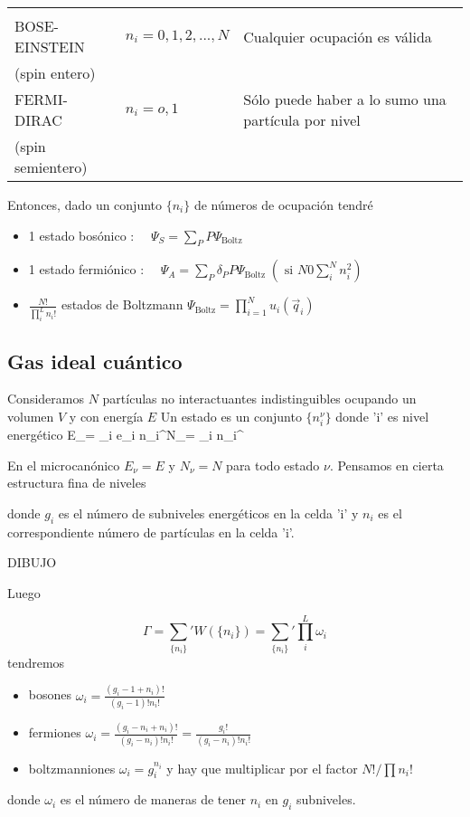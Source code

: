 \documentclass[10pt,oneside]{CBFT_book}
\begin{document}
\begin{center}
\begin{tabular}{|l|l|l|}
\hline
 & & \\
BOSE-EINSTEIN & $ n_i = 0,1,2, ... , N $ & Cualquier ocupación es válida \\
 (spin entero) & & \\
FERMI-DIRAC  & $ n_i = o, 1 $ & Sólo puede haber a lo sumo una partícula por nivel \\
 (spin semientero) & & \\
\hline
\end{tabular}
\end{center}

Entonces, dado un conjunto $ \{ n_i \} $ de números de ocupación tendré 

\begin{itemize}
\item 1 estado bosónico : $ \quad \Psi_S = \sum_P P \Psi_{\text{Boltz}}$
\item 1 estado fermiónico : $ \quad \Psi_A = \sum_P \delta_P P \Psi_{\text{Boltz}} 
	\; (\text{ si } N 0 \sum_i^N n_i^2 )$
\item $ \frac{N!}{\prod_i^L n_i!} $ estados de Boltzmann $ \Psi_{\text{Boltz}} = \prod_{i=1}^N u_i(\vec{q}_i) $
\end{itemize}


\subsection{Gas ideal cuántico}

Consideramos $N$ partículas no interactuantes indistinguibles ocupando un volumen $V$ y con energía $E$
Un estado es un conjunto $ \{ n_i^\nu \} $ donde 'i' es nivel energético
\be
	E_\nu = \sum_i e_i n_i^\nu \qquad \qquad N_\nu = \sum_i n_i^\nu
	\label{cond_EN}
\ee

En el microcanónico $ E_\nu = E $ y $ N_\nu = N $ para todo estado $\nu$. Pensamos en cierta estructura 
fina de niveles


donde $g_i$ es el número de subniveles energéticos en la celda 'i' y $n_i$ es el correspondiente número de
partículas en la celda 'i'.

DIBUJO

Luego

\[
	\Gamma = \sum_{ \{ n_i \} }' W(\{ n_i \}) = \sum_{ \{ n_i \} }' \prod_i^L  \omega_i 
\]
tendremos
\begin{itemize}
 \item bosones $ \omega_i = \frac{ ( g_i - 1 + n_i)! }{ (g_i - 1)!n_i!} $
 \item fermiones $ \omega_i = \frac{ ( g_i - n_i + n_i )! }{ (g_i - n_i)!n_i!} =
		\frac{ g_i! }{ (g_i -n_i )! n_i!}$
 \item boltzmanniones $ \omega_i = g_i^{n_i} $ y hay que multiplicar por el factor
		$ N! / \prod n_i! $
\end{itemize}
donde $ \omega_i $ es el número de maneras de tener $ n_i $ en $ g_i $ subniveles.
\end{document}
